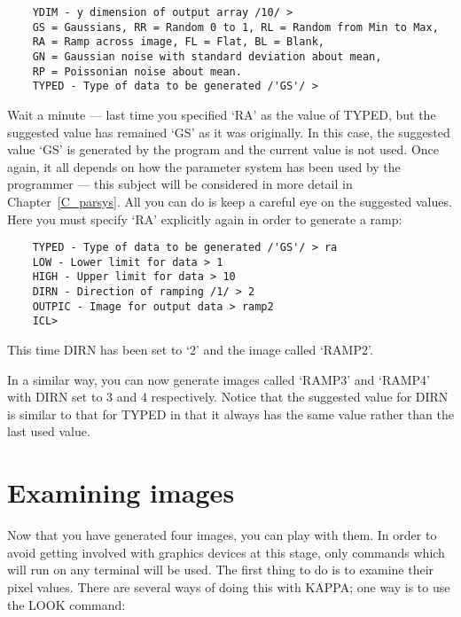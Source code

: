 \begin{small}
\begin{verbatim}
    YDIM - y dimension of output array /10/ >
    GS = Gaussians, RR = Random 0 to 1, RL = Random from Min to Max,
    RA = Ramp across image, FL = Flat, BL = Blank,
    GN = Gaussian noise with standard deviation about mean,
    RP = Poissonian noise about mean.
    TYPED - Type of data to be generated /'GS'/ >
\end{verbatim}
\end{small}

Wait a minute --- last time you specified `RA' as the value of TYPED, but the
suggested value has remained `GS' as it was originally.
In this case, the suggested value `GS' is generated by the program and the
current value is not used.
Once again, it all depends on how the parameter system has been used by the
programmer --- this subject will be considered in more detail in
Chapter~\ref{C_parsys}.
All you can do is keep a careful eye on the suggested values.
Here you must specify `RA' explicitly again in order to generate a ramp:

\begin{small}
\begin{verbatim}
    TYPED - Type of data to be generated /'GS'/ > ra
    LOW - Lower limit for data > 1
    HIGH - Upper limit for data > 10
    DIRN - Direction of ramping /1/ > 2
    OUTPIC - Image for output data > ramp2
    ICL>
\end{verbatim}
\end{small}

This time DIRN has been set to `2' and the image  called `RAMP2'.

In a similar way, you can now generate images called `RAMP3' and `RAMP4' with
DIRN set to 3 and 4 respectively.
Notice that the suggested value for DIRN is similar to that for TYPED in that
it always has the same value rather than the last used value.

\section{Examining images}
\label{S_examimag}

Now that you have generated four images, you can play with them.
In order to avoid getting involved with graphics devices at this stage, only
commands which will run on any terminal will be used.
The first thing to do is to examine their pixel values.
There are several ways of doing this with KAPPA; one way is to use the LOOK
command:

